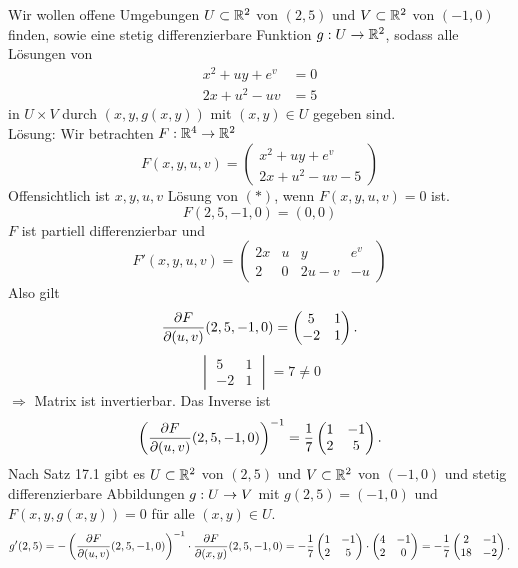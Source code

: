 \documentclass[../ana2u.tex]{subfiles}
\begin{document}
\begin{bsp}[Umkehrsatz]
    Wir wollen offene Umgebungen \(U \subset \mathbb{R}^2\) von \((2,5)\)
    und \(V \subset \mathbb{R}^2\) von \((-1, 0)\) finden, sowie
    eine stetig differenzierbare Funktion \( g:U\rightarrow \mathbb{R}^2 \), 
    sodass alle Lösungen von %
    \begin{align*}
        x^2 + u y + e^v &= 0 \\
        2x+u^2-uv &= 5
    \end{align*}
    in \(U \times V\) durch \((x, y, g(x,y))\) mit \((x,y) \in U\)
    gegeben sind.\\
    Lösung: Wir betrachten \( F:\mathbb{R}^4\rightarrow \mathbb{R}^2 \)
    \[ F(x,y,u,v) = \begin{pmatrix}
        x^2+uy+e^v \\
        2x+u^2-uv-5
    \end{pmatrix} \tag{\(*\)}\]
    Offensichtlich ist \(x,y,u,v\) Lösung von \((*)\), wenn
    \(F(x,y,u,v) = 0\) ist.
    \[ F(2,5,-1,0) = (0,0) \]
    \(F\) ist partiell differenzierbar und 
    \[ F'(x,y,u,v) = \begin{pmatrix}
        2x & u & y & e^v \\
        2 & 0 & 2u-v & -u
    \end{pmatrix} \]
    Also gilt 
    \[ \frac{\partial F}{\partial(u,v)}(2,5,-1,0) = \begin{pmatrix}
        5 & 1 \\ -2 & 1
    \end{pmatrix}. \]
    \[ \begin{vmatrix}
        5 & 1 \\
        -2 & 1
    \end{vmatrix} = 7 \neq 0 \]
    \(\Rightarrow \) Matrix ist invertierbar.
    Das Inverse ist 
    \[ \left( \frac{\partial F}{\partial(u,v)}(2,5,-1,0) \right)^{-1} 
    = \frac{1}{7} \begin{pmatrix}
        1 & -1 \\ 2 & 5
    \end{pmatrix}. \]
    Nach Satz 17.1 gibt es \(U \subset \mathbb{R}^2\) von \((2,5)\) und
    \(V \subset \mathbb{R}^2\) von \((-1, 0)\) und stetig differenzierbare
    Abbildungen \(g:U\rightarrow V\) mit \(g(2,5) = (-1, 0)\) und
    \(F(x,y,g(x,y)) = 0\) für alle \((x,y) \in U\).
    \[ g'(2,5) = - \left(
        \frac{\partial F}{\partial(u,v)}(2,5,-1,0)
    \right)^{-1} \cdot 
    \frac{\partial F}{\partial(x,y)}(2,5,-1,0) 
    = -\frac{1}{7}\begin{pmatrix}
        1 & -1 \\ 2 & 5
    \end{pmatrix} \cdot \begin{pmatrix}
        4 & -1 \\ 2 & 0
    \end{pmatrix} 
    = -\frac{1}{7} \begin{pmatrix}
        2 & -1 \\ 18 & -2
    \end{pmatrix}. \]
\end{bsp}
\end{document}
